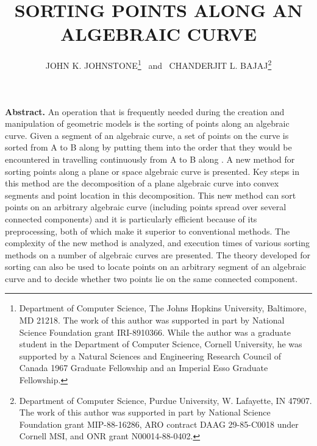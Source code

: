 \newif\ifFull
\Fulltrue
{} 
%

%
%
\DoubleSpace
\setlength{\oddsidemargin}{0pt}
\setlength{\evensidemargin}{0pt}
\setlength{\headsep}{0pt}
\setlength{\topmargin}{0pt}
\setlength{\textheight}{8.75in}
\setlength{\textwidth}{6.5in}
%
%
\title{SORTING POINTS ALONG AN ALGEBRAIC CURVE}
\author{
JOHN K. JOHNSTONE\thanks{Department of Computer Science, The Johns Hopkins University, 
Baltimore, MD 21218.
The work of this author was supported in part by National Science Foundation grant 
IRI-8910366.
While the author was a graduate
student in the Department of Computer Science, Cornell University, he was supported
by a Natural Sciences and Engineering
Research Council of Canada 1967 Graduate 
Fellowship and an Imperial Esso Graduate Fellowship.}
\ and \ 
CHANDERJIT L. BAJAJ\thanks{Department of Computer Science, Purdue University, 
W. Lafayette, IN  47907.
The work of this author was supported in part by National Science Foundation grant
MIP-88-16286, 
ARO contract DAAG 29-85-C0018 under Cornell MSI, and
ONR grant N00014-88-0402.}
}
%

\maketitle

{\bf Abstract.}
An operation that is frequently needed during the creation and manipulation of geometric 
models is the sorting of points along an algebraic curve.
Given a segment  of an algebraic curve, a set of points on the curve is sorted
from A to B along  by putting them into the order that they would be encountered 
in travelling continuously from A to B along \arc{AB}.
A new method for sorting points along a plane or space algebraic curve is presented.
Key steps in this method are the decomposition of a plane algebraic curve into convex 
segments and point location in this decomposition.
This new method can sort points on an arbitrary algebraic curve 
(including points spread over several connected components)
and it is particularly efficient 
because of its preprocessing, both of which make it superior to conventional methods.
The complexity of the new method is analyzed, and execution times of various sorting
methods on a number of algebraic curves are presented.
The theory developed for sorting can also be used to locate points on an arbitrary 
segment of an algebraic curve and to decide whether two points lie on the same connected 
component.

